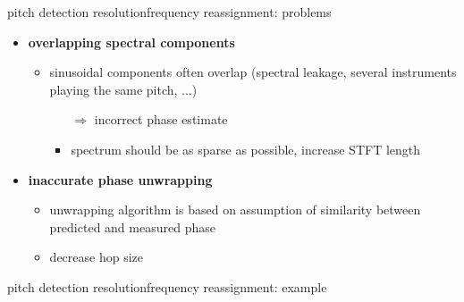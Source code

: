         \begin{frame}{pitch detection resolution}{frequency reassignment: problems}
                \begin{itemize}
                    \item   \textbf{overlapping spectral components}
                        \begin{itemize}
                            \item   sinusoidal components often overlap (spectral leakage, several instruments playing the same pitch, ...)
                                \begin{itemize}
                                    \item[$\Rightarrow$] incorrect phase estimate
                                    \bigskip
                                    \item<2-> spectrum should be as sparse as possible, increase STFT length
                                \end{itemize}
                        \end{itemize}
                    \item<3->   \textbf{inaccurate phase unwrapping} 
                        \begin{itemize}
                            \item   unwrapping algorithm is based on assumption of similarity between predicted and measured phase
                            \bigskip
                            \item<2-> decrease hop size
                        \end{itemize}
                \end{itemize}
        \end{frame}
        \begin{frame}{pitch detection resolution}{frequency reassignment: example}
        \end{frame}
